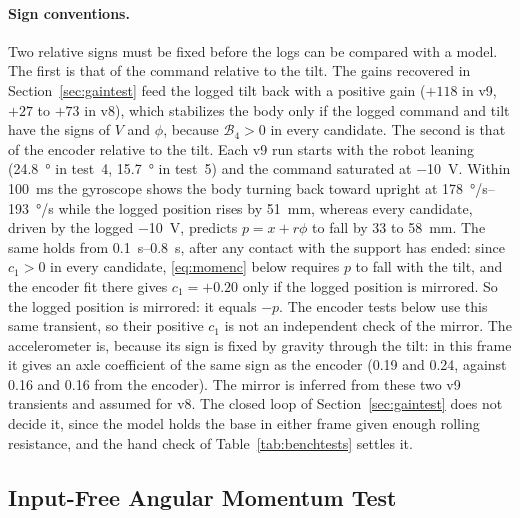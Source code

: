 \paragraph{Sign conventions.} Two relative signs must be fixed before the logs
can be compared with a model. The first is that of the command relative to the
tilt. The gains recovered in Section~\ref{sec:gaintest} feed the logged tilt
back with a positive gain ($+118$ in v9, $+27$ to $+73$ in v8), which
stabilizes the body only if the logged command and tilt have the signs of $V$
and $\phi$, because $\mathcal{B}_4>0$ in every candidate. The second is that of
the encoder relative to the tilt. Each v9 run starts with the robot leaning
(\SI{24.8}{\degree} in test~4, \SI{15.7}{\degree} in test~5) and the command
saturated at \SI{-10}{V}. Within \SI{100}{ms} the gyroscope shows the body
turning back toward upright at \SIrange{178}{193}{\degree/s} while the logged position rises
by \SI{51}{mm}, whereas every candidate, driven by the logged \SI{-10}{V},
predicts $p=x+r\phi$ to fall by 33 to \SI{58}{mm}. The same holds from
\SIrange{0.1}{0.8}{s}, after any contact with the support has ended: since
$c_1>0$ in every candidate, \eqref{eq:momenc} below requires $p$ to fall with
the tilt, and the encoder fit there gives $c_1=+0.20$ only if the logged
position is mirrored. So the logged position is mirrored: it equals $-p$. The
encoder tests below use this same transient, so their positive $c_1$ is not an
independent check of the mirror. The accelerometer is, because its sign is
fixed by gravity through the tilt: in this frame it gives an axle coefficient
of the same sign as the encoder (0.19 and 0.24, against 0.16 and 0.16 from the
encoder). The mirror is inferred from these two v9 transients and assumed for
v8. The closed loop of Section~\ref{sec:gaintest} does not decide it, since
the model holds the base in either frame given enough rolling resistance, and
the hand check of Table~\ref{tab:benchtests} settles it.

\subsection{Input-Free Angular Momentum Test}
\label{sec:momtest}

